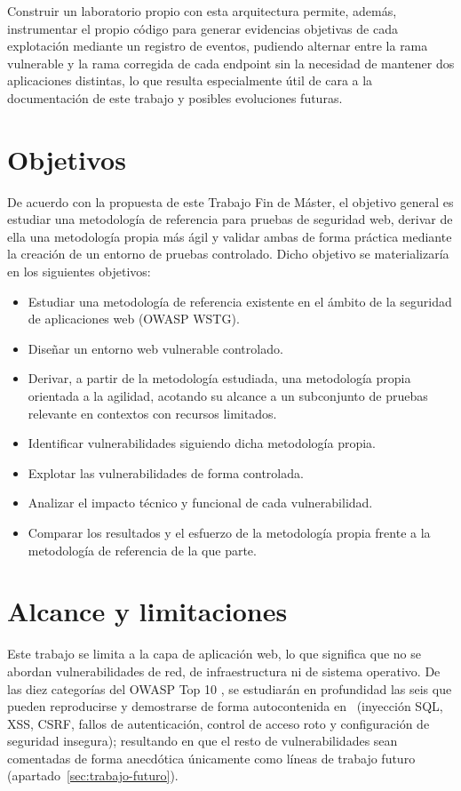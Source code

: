 Construir un laboratorio propio con esta arquitectura permite, además,
instrumentar el propio código para generar evidencias objetivas de cada
explotación mediante un registro de eventos, pudiendo alternar entre la rama
vulnerable y la rama corregida de cada endpoint sin la necesidad de mantener 
dos aplicaciones distintas, lo que resulta especialmente útil de cara a la 
documentación de este trabajo y posibles evoluciones futuras.

\section{Objetivos}
\label{sec:objetivos}

De acuerdo con la propuesta de este Trabajo Fin de Máster, el objetivo
general es estudiar una metodología de referencia para pruebas de seguridad
web, derivar de ella una metodología propia más ágil y validar ambas de
forma práctica mediante la creación de un entorno de pruebas controlado.
Dicho objetivo se materializaría
en los siguientes objetivos:

\begin{itemize}
\item Estudiar una metodología de referencia existente en el ámbito de la
  seguridad de aplicaciones web (OWASP WSTG).
\item Diseñar un entorno web vulnerable controlado.
\item Derivar, a partir de la metodología estudiada, una metodología propia
  orientada a la agilidad, acotando su alcance a un subconjunto de pruebas
  relevante en contextos con recursos limitados.
\item Identificar vulnerabilidades siguiendo dicha metodología propia.
\item Explotar las vulnerabilidades de forma controlada.
\item Analizar el impacto técnico y funcional de cada vulnerabilidad.
\item Comparar los resultados y el esfuerzo de la metodología propia frente
  a la metodología de referencia de la que parte.
\end{itemize}

\section{Alcance y limitaciones}

Este trabajo se limita a la capa de aplicación web, lo que significa que no se abordan
vulnerabilidades de red, de infraestructura ni de sistema operativo. De las
diez categorías del OWASP Top 10 , se estudiarán en profundidad las seis
que pueden reproducirse y demostrarse de forma autocontenida en
\breachlab~(inyección SQL, XSS, CSRF, fallos de autenticación, control de
acceso roto y configuración de seguridad insegura); resultando en que el resto de 
vulnerabilidades sean comentadas de forma anecdótica únicamente como líneas de trabajo 
futuro (apartado~\ref{sec:trabajo-futuro}).

